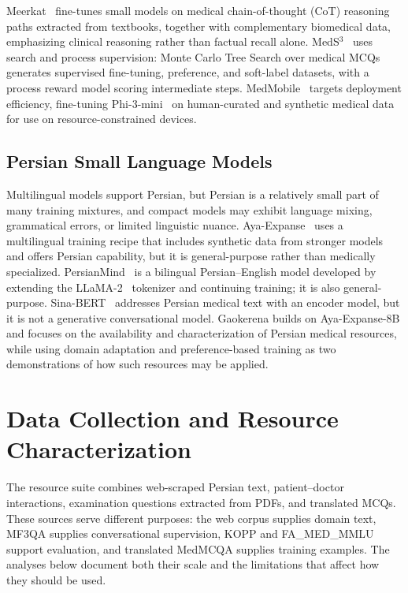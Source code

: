 \documentclass[manuscript,screen,review]{acmart}
\begin{document}
Meerkat~\cite{b7} fine-tunes small models on medical chain-of-thought (CoT) reasoning paths extracted from textbooks, together with complementary biomedical data, emphasizing clinical reasoning rather than factual recall alone. MedS$^3$~\cite{b9} uses search and process supervision: Monte Carlo Tree Search over medical MCQs generates supervised fine-tuning, preference, and soft-label datasets, with a process reward model scoring intermediate steps. MedMobile~\cite{b10} targets deployment efficiency, fine-tuning Phi-3-mini~\cite{b11} on human-curated and synthetic medical data for use on resource-constrained devices.

\subsection{Persian Small Language Models}\label{subsec2.2}

Multilingual models support Persian, but Persian is a relatively small part of many training mixtures, and compact models may exhibit language mixing, grammatical errors, or limited linguistic nuance. Aya-Expanse~\cite{b12,b13} uses a multilingual training recipe that includes synthetic data from stronger models and offers Persian capability, but it is general-purpose rather than medically specialized. PersianMind~\cite{b14} is a bilingual Persian--English model developed by extending the LLaMA-2~\cite{b15} tokenizer and continuing training; it is also general-purpose. Sina-BERT~\cite{b6} addresses Persian medical text with an encoder model, but it is not a generative conversational model. Gaokerena builds on Aya-Expanse-8B and focuses on the availability and characterization of Persian medical resources, while using domain adaptation and preference-based training as two demonstrations of how such resources may be applied.

\section{Data Collection and Resource Characterization}\label{sec3}

The resource suite combines web-scraped Persian text, patient--doctor interactions, examination questions extracted from PDFs, and translated MCQs. These sources serve different purposes: the web corpus supplies domain text, MF3QA supplies conversational supervision, KOPP and FA\_MED\_MMLU support evaluation, and translated MedMCQA supplies training examples. The analyses below document both their scale and the limitations that affect how they should be used.
\end{document}
